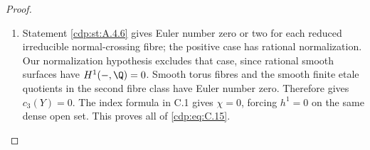\begin{proof}
\begin{enumerate}[label={$\langle1\rangle$\arabic*.},leftmargin=*]
\item Statement \ref{cdp:st:A.4.6} gives Euler number zero or two for each reduced irreducible normal-crossing fibre; the positive case has rational normalization. Our normalization hypothesis excludes that case, since rational smooth surfaces have $H^1(-,\Q)=0$. Smooth torus fibres and the smooth finite etale quotients in the second fibre class have Euler number zero. Therefore  gives $c_3(Y)=0$. The index formula in C.1 gives $\chi=0$, forcing $h^1=0$ on the same dense open set. This proves all of \eqref{cdp:eq:C.15}.

\end{enumerate}
\end{proof}
